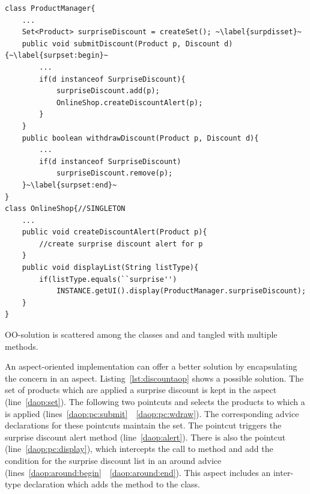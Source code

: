 \begin{lstlisting}[float, caption={A Java implementation of discount alert concern}, label={lst:discountalert}]
class ProductManager{
	...
	Set<Product> surpriseDiscount = createSet(); ~\label{surpdisset}~
	public void submitDiscount(Product p, Discount d){~\label{surpset:begin}~
		...
		if(d instanceof SurpriseDiscount){
			surpriseDiscount.add(p);
			OnlineShop.createDiscountAlert(p);
		}
	}
	public boolean withdrawDiscount(Product p, Discount d){
		...
		if(d instanceof SurpriseDiscount)
			surpriseDiscount.remove(p);
	}~\label{surpset:end}~
}
class OnlineShop{//SINGLETON
	...
	public void createDiscountAlert(Product p){
		//create surprise discount alert for p
	}
	public void displayList(String listType){
		if(listType.equals(``surprise'')
			INSTANCE.getUI().display(ProductManager.surpriseDiscount);
	}
}
\end{lstlisting}


 OO-solution is scattered among the classes  and  and tangled with multiple methods.

An aspect-oriented implementation can offer a better solution by encapsulating the concern in an aspect. Listing~\ref{lst:discountaop} shows a possible solution. The set of products which are applied a surprise discount is kept in the aspect (line~\ref{daop:set}). The following two pointcuts  and  selects the products to which a  is applied (lines~\ref{daop:pc:submit}~\textendash~\ref{daop:pc:wdraw}). The corresponding advice declarations for these pointcuts maintain the  set. The  pointcut triggers the surprise discount alert method (line~\ref{daop:alert}). There is also the  pointcut (line~\ref{daop:pc:display}), which intercepts the call to  method and add the condition for the surprise discount list in an around advice (lines~\ref{daop:around:begin}~\textendash~\ref{daop:around:end}). This aspect includes an inter-type declaration which adds the  method to the  class.


